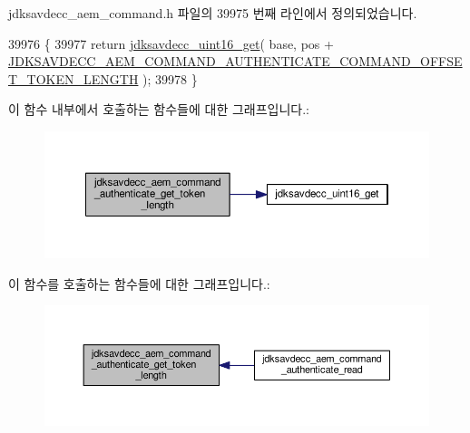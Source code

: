 jdksavdecc\+\_\+aem\+\_\+command.\+h 파일의 39975 번째 라인에서 정의되었습니다.


\begin{DoxyCode}
39976 \{
39977     \textcolor{keywordflow}{return} \hyperlink{group__endian_ga3fbbbc20be954aa61e039872965b0dc9}{jdksavdecc\_uint16\_get}( base, pos + 
      \hyperlink{group__command__authenticate_ga6dea4aaa99a318d656816c1f1fef5e3e}{JDKSAVDECC\_AEM\_COMMAND\_AUTHENTICATE\_COMMAND\_OFFSET\_TOKEN\_LENGTH}
       );
39978 \}
\end{DoxyCode}


이 함수 내부에서 호출하는 함수들에 대한 그래프입니다.\+:
\nopagebreak
\begin{figure}[H]
\begin{center}
\leavevmode
\includegraphics[width=350pt]{group__command__authenticate_gac1a07f001172b01d8199d7a9483aea77_cgraph}
\end{center}
\end{figure}




이 함수를 호출하는 함수들에 대한 그래프입니다.\+:
\nopagebreak
\begin{figure}[H]
\begin{center}
\leavevmode
\includegraphics[width=350pt]{group__command__authenticate_gac1a07f001172b01d8199d7a9483aea77_icgraph}
\end{center}
\end{figure}


